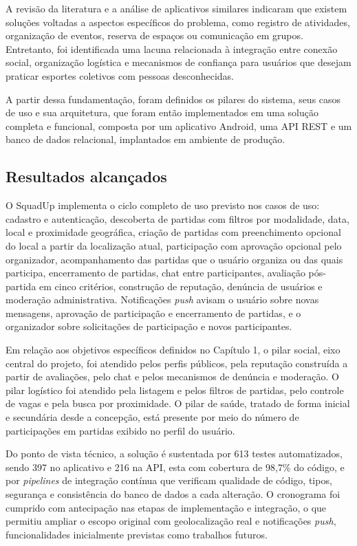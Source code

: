 \documentclass[a4paper, 12pt]{article}
\begin{document}
\begin{justify}
A revisão da literatura e a análise de aplicativos similares indicaram que existem soluções voltadas a aspectos específicos do problema, como registro de atividades, organização de eventos, reserva de espaços ou comunicação em grupos. Entretanto, foi identificada uma lacuna relacionada à integração entre conexão social, organização logística e mecanismos de confiança para usuários que desejam praticar esportes coletivos com pessoas desconhecidas.

A partir dessa fundamentação, foram definidos os pilares do sistema, seus casos de uso e sua arquitetura, que foram então implementados em uma solução completa e funcional, composta por um aplicativo Android, uma API REST e um banco de dados relacional, implantados em ambiente de produção.

\subsection{Resultados alcançados}

O SquadUp implementa o ciclo completo de uso previsto nos casos de uso: cadastro e autenticação, descoberta de partidas com filtros por modalidade, data, local e proximidade geográfica, criação de partidas com preenchimento opcional do local a partir da localização atual, participação com aprovação opcional pelo organizador, acompanhamento das partidas que o usuário organiza ou das quais participa, encerramento de partidas, chat entre participantes, avaliação pós-partida em cinco critérios, construção de reputação, denúncia de usuários e moderação administrativa. Notificações \textit{push} avisam o usuário sobre novas mensagens, aprovação de participação e encerramento de partidas, e o organizador sobre solicitações de participação e novos participantes.

Em relação aos objetivos específicos definidos no Capítulo 1, o pilar social, eixo central do projeto, foi atendido pelos perfis públicos, pela reputação construída a partir de avaliações, pelo chat e pelos mecanismos de denúncia e moderação. O pilar logístico foi atendido pela listagem e pelos filtros de partidas, pelo controle de vagas e pela busca por proximidade. O pilar de saúde, tratado de forma inicial e secundária desde a concepção, está presente por meio do número de participações em partidas exibido no perfil do usuário.

Do ponto de vista técnico, a solução é sustentada por 613 testes automatizados, sendo 397 no aplicativo e 216 na API, esta com cobertura de 98,7\% do código, e por \textit{pipelines} de integração contínua que verificam qualidade de código, tipos, segurança e consistência do banco de dados a cada alteração. O cronograma foi cumprido com antecipação nas etapas de implementação e integração, o que permitiu ampliar o escopo original com geolocalização real e notificações \textit{push}, funcionalidades inicialmente previstas como trabalhos futuros.


\end{justify}
\end{document}
